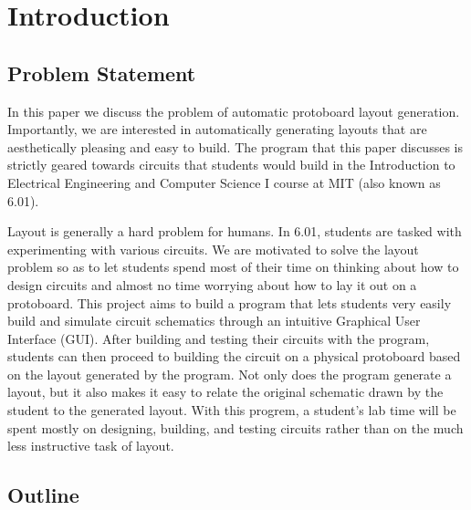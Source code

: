

\chapter{Introduction}

\section{Problem Statement}

In this paper we discuss the problem of automatic protoboard layout generation.
Importantly, we are interested in automatically generating layouts that are
aesthetically pleasing and easy to build. The program that this paper discusses
is strictly geared towards circuits that students would build in the
Introduction to Electrical Engineering and Computer Science I course at MIT (also known as 6.01).

Layout is generally a hard problem for humans. In 6.01, students are tasked with
experimenting with various circuits. We are motivated to solve the layout
problem so as to let students spend most of their time on thinking about how to
design
circuits and almost no time worrying about how to lay it out on a protoboard.
This project aims to build a program that lets students very easily build and
simulate circuit schematics through an intuitive Graphical User Interface (GUI).
After building and testing their circuits with the program, students can then
proceed to building the circuit on a physical protoboard based on the layout
generated by the program. Not only does the program generate a layout, but it
also makes it easy to relate the original schematic drawn by the student to the
generated layout. With this progrem, a student's lab time will be spent mostly
on designing, building, and testing circuits rather than on the much less
instructive task of layout.

\section{Outline}

